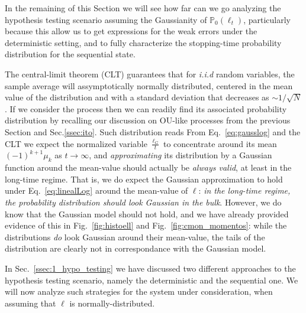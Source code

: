 \bigskip

In the remaining of this Section we will see how far can we go analyzing the hypothesis testing scenario assuming the Gaussianity of $\mathbb{P}_{0}(\ell_{t})$, particularly because this allow us to get expressions for the weak errors under the deterministic setting, and to fully characterize the stopping-time probability distribution for the sequential state.

The central-limit theorem (CLT) guarantees that for \textit{i.i.d} random variables, the sample average will assymptotically normally distributed, centered in the mean value of the distribution and with a standard deviation that decreases as $\sim 1/\sqrt{N}$. If we consider the process
then we can readily find its associated probability distribution by recalling our discussion on OU-like processes from the previous Section and Sec.\ref{ssec:ito}. Such distribution reads
From Eq.~\ref{eq:gausslog} and the CLT we expect the normalized variable $\frac{\ell_G}{t}$ to concentrate around its mean $(-1)^{k+1}\mu_k$ as $t\rightarrow\infty$, and \textit{approximating} its distribution by a Gaussian function around the mean-value should actually be \textit{always valid}, at least in the long-time regime. That is, we do expect the Gaussian approximation to hold under Eq.~\ref{eq:linealLog} around the mean-value of $\ell$: \textit{in the long-time regime, the probability distribution should look Gaussian in the bulk}. However, we do know that the Gaussian model should not hold, and we have already provided evidence of this in Fig.~\ref{fig:histoell}
and Fig.~\ref{fig:cmon_momentos}: while the distributions \textit{do} look Gaussian around their mean-value, the tails of the distribution are clearly not in correspondance with the Gaussian model.

In Sec.~\ref{ssec:1_hypo_testing} we have discussed two different approaches to the hypothesis testing scenario, namely the deterministic and the sequential one. We will now analyze such strategies for the system under consideration, when assuming that $\ell$ is normally-distributed.

